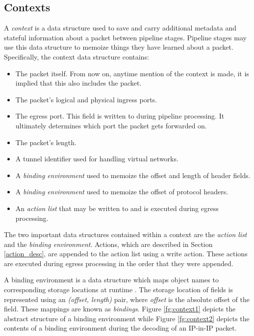 \subsection{Contexts} \label{context_desc}

A \emph{context} is a data structure used to save and carry
additional metadata and stateful information about a packet between pipeline stages.
Pipeline stages may use this data structure to memoize things they have learned
about a packet. Specifically, the context data structure contains:

\begin{itemize} 
\item The packet itself. From now on, anytime mention of the
context is made, it is implied that this also includes the packet. 

\item
The packet's logical and physical ingress ports. 

\item The egress port. This
field is written to during pipeline processing. It ultimately determines which
port the packet gets forwarded on. 

\item The packet's length. 

\item A tunnel identifier used for handling virtual networks.

\item A \emph{binding environment} used to memoize the offset
and length of header fields. 

\item A \emph{binding environment} used to memoize the offset
of protocol headers. 

\item An \emph{action list} that may be written to and is
executed during egress processing. 
\end{itemize}

The two important data structures contained within a context are 
the \emph{action list} and the \emph{binding environment}.
Actions, which are described in Section \ref{action_desc}, are appended
to the action list using a write action.
These actions are executed during egress processing in the 
order that they were appended.

A binding environment is a data structure which maps object names to
corresponding storage locations at runtime \cite{compilers1}.
The storage location of fields is represented using an \emph{(offset, length)} pair, where \textit{offset} is the absolute offset of the field.
These mappings are known as \emph{bindings}. Figure \ref{fg:context1} 
depicts the abstract structure of a binding environment while Figure \ref{fg:context2}
depicts the contents of a binding environment during the decoding of an IP-in-IP packet.

